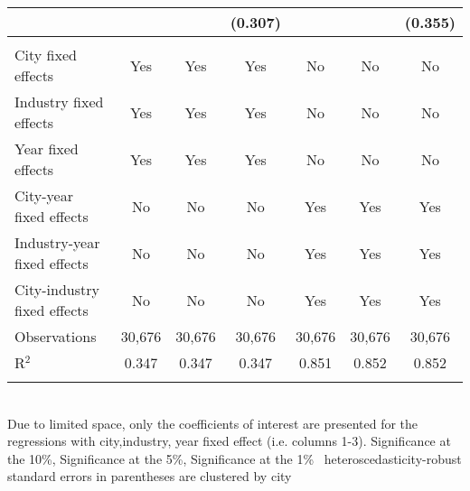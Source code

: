 \documentclass[12pt]{article}
\begin{document}
\begin{table}[!htbp]
\begin{adjustbox}{width=\textwidth, totalheight=\baselineskip,keepaspectratio}
\begin{tabular}{@{\extracolsep{5pt}}lcccccc}
  &  &  & (0.307) &  &  & (0.355) \\ 
 \hline \\[-1.8ex] 
City fixed effects & Yes & Yes & Yes & No & No & No \\ 
Industry fixed effects & Yes & Yes & Yes & No & No & No \\ 
Year fixed effects & Yes & Yes & Yes & No & No & No \\ 
City-year fixed effects & No & No & No & Yes & Yes & Yes \\ 
Industry-year fixed effects & No & No & No & Yes & Yes & Yes \\ 
City-industry fixed effects & No & No & No & Yes & Yes & Yes \\ 
Observations & 30,676 & 30,676 & 30,676 & 30,676 & 30,676 & 30,676 \\ 
R$^{2}$ & 0.347 & 0.347 & 0.347 & 0.851 & 0.852 & 0.852 \\ 
\hline 
\hline \\[-1.8ex] 
\end{tabular}
\end{adjustbox}
\begin{tablenotes} 
 \small 
 \item \\ 
\footnotesize{
Due to limited space, only the coefficients of interest are presented 
for the regressions with city,industry, year fixed effect (i.e. columns 1-3).
\sym{*} Significance at the 10\%, \sym{**} Significance at the 5\%, \sym{***} Significance at the 1\% \
heteroscedasticity-robust standard errors in parentheses are clustered by city 
}
 
\end{tablenotes}
\end{table}
\end{document}
